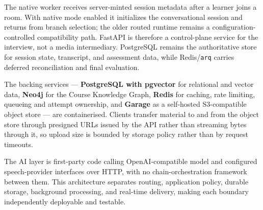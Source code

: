 The native worker receives server-minted session metadata after a learner joins a room. With native mode enabled it initializes the conversational session and returns from branch selection; the older routed runtime remains a configuration-controlled compatibility path. FastAPI is therefore a control-plane service for the interview, not a media intermediary. PostgreSQL remains the authoritative store for session state, transcript, and assessment data, while Redis/\texttt{arq} carries deferred reconciliation and final evaluation.

The backing services --- \textbf{PostgreSQL with pgvector} for relational and vector data, \textbf{Neo4j} for the Course Knowledge Graph, \textbf{Redis} for caching, rate limiting, queueing and attempt ownership, and \textbf{Garage} as a self-hosted S3-compatible object store --- are containerised. Clients transfer material to and from the object store through presigned URLs issued by the API rather than streaming bytes through it, so upload size is bounded by storage policy rather than by request timeouts.

The AI layer is first-party code calling OpenAI-compatible model and configured speech-provider interfaces over HTTP, with no chain-orchestration framework between them. This architecture separates routing, application policy, durable storage, background processing, and real-time delivery, making each boundary independently deployable and testable.
